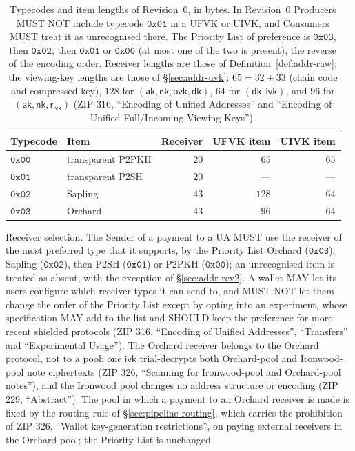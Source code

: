 \documentclass[11pt,a4paper]{article}
\theoremstyle{definition}
\newcommand{\aksym}{\ensuremath{\mathsf{ak}}}
\newcommand{\nksym}{\ensuremath{\mathsf{nk}}}
\newcommand{\ivk}{\ensuremath{\mathsf{ivk}}}
\newcommand{\ovk}{\ensuremath{\mathsf{ovk}}}
\newcommand{\dk}{\ensuremath{\mathsf{dk}}}
\newcommand{\rivk}{\ensuremath{\mathsf{r_{ivk}}}}
\begin{document}
\begin{table}[tp]
\centering\small
\begin{tabular}{@{}llrrr@{}}
\toprule
Typecode & Item & Receiver & UFVK item & UIVK item \\
\midrule
$\mathtt{0x00}$ & transparent P2PKH & $20$ & $65$ & $65$ \\
$\mathtt{0x01}$ & transparent P2SH & $20$ & --- & --- \\
$\mathtt{0x02}$ & Sapling & $43$ & $128$ & $64$ \\
$\mathtt{0x03}$ & Orchard & $43$ & $96$ & $64$ \\
\bottomrule
\end{tabular}
\caption{Typecodes and item lengths of Revision~$0$, in bytes. In
Revision~$0$ Producers MUST NOT include typecode $\mathtt{0x01}$ in a UFVK
or UIVK, and Consumers MUST treat it as unrecognised there. The Priority
List of preference is $\mathtt{0x03}$, then $\mathtt{0x02}$, then
$\mathtt{0x01}$ or $\mathtt{0x00}$ (at most one of the two is present), the
reverse of the encoding order. Receiver lengths are those of
Definition~\ref{def:addr-raw}; the viewing-key lengths are those of
\S\ref{sec:addr-uvk}: $65 = 32 + 33$ (chain code and compressed
key), $128$ for $(\aksym, \nksym, \ovk, \dk)$, $64$ for $(\dk, \ivk)$, and
$96$ for $(\aksym, \nksym, \rivk)$ (ZIP 316, ``Encoding of Unified
Addresses'' and ``Encoding of Unified Full/Incoming Viewing Keys'').}
\label{tab:addr-typecodes}
\end{table}

Receiver selection. The Sender of a payment to a UA MUST use the receiver of
the most preferred type that it supports, by the Priority List Orchard
($\mathtt{0x03}$), Sapling ($\mathtt{0x02}$), then P2SH ($\mathtt{0x01}$)
or P2PKH ($\mathtt{0x00}$); an unrecognised item is treated as absent, with
the exception of \S\ref{sec:addr-rev2}. A wallet MAY let its users configure
which receiver types it can send to, and MUST NOT let them change the order
of the Priority List except by opting into an experiment, whose
specification MAY add to the list and SHOULD keep the preference for more
recent shielded protocols (ZIP 316, ``Encoding of Unified Addresses'',
``Transfers'' and ``Experimental Usage''). The Orchard receiver belongs to
the Orchard protocol, not to a pool: one $\ivk$ trial-decrypts both
Orchard-pool and Ironwood-pool note ciphertexts (ZIP 326, ``Scanning for
Ironwood-pool and Orchard-pool notes''), and the Ironwood pool changes no
address structure or encoding (ZIP 229, ``Abstract''). The pool in which a
payment to an Orchard receiver is made is fixed by the routing rule of
\S\ref{sec:pipeline-routing}, which carries the prohibition of ZIP 326,
``Wallet key-generation restrictions'', on paying external receivers in the
Orchard pool; the Priority List is unchanged.
\end{document}
